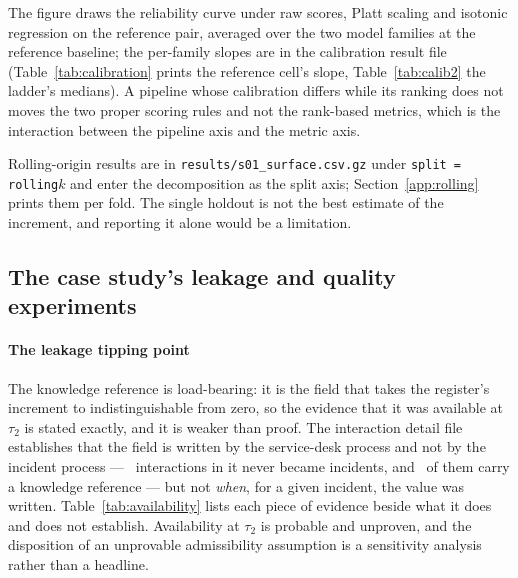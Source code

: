 The figure draws the reliability curve under raw scores, Platt scaling and
isotonic regression on the reference pair, averaged over the two model
families at the reference baseline; the per-family slopes are in the
calibration result file (Table~\ref{tab:calibration} prints the reference
cell's slope, Table~\ref{tab:calib2} the ladder's medians). A pipeline whose
calibration differs while its ranking does not moves the two proper scoring
rules and not the rank-based metrics, which is the interaction between
the pipeline axis and the metric axis.

Rolling-origin results are in \texttt{results/s01\_surface.csv.gz} under
\texttt{split = rolling$k$} and enter the decomposition as the split axis;
Section~\ref{app:rolling} prints them per fold. The single holdout is not
the best estimate of the increment, and reporting it alone would be a
limitation.

\subsection{The case study's leakage and quality experiments}
\label{app:casedetail}



\paragraph{The leakage tipping point}

The knowledge reference is load-bearing: it is the field that takes the
register's increment to indistinguishable from zero, so the evidence that it
was available at $\tau_2$ is stated exactly, and it is weaker than proof. The
interaction detail file establishes that the field is written by the
service-desk process and not by the incident process --- \nOrphans\
interactions in it never became incidents, and \kmOrphanPopulated\ of them
carry a knowledge reference --- but not \emph{when}, for a given incident, the
value was written. Table~\ref{tab:availability} lists each piece of evidence
beside what it does and does not establish. Availability at $\tau_2$ is
probable and unproven, and the disposition of an unprovable admissibility
assumption is a sensitivity analysis rather than a headline.



